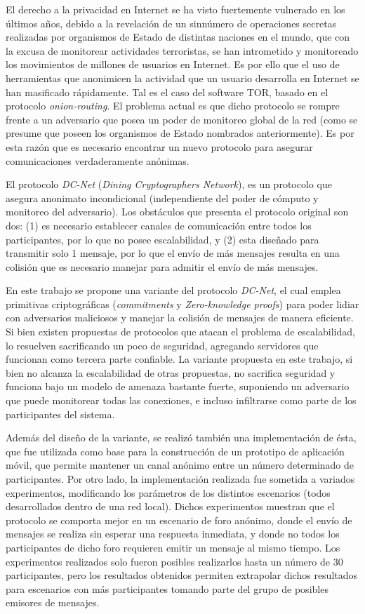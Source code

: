 El derecho a la privacidad en Internet se ha visto fuertemente 
vulnerado en los últimos años, debido a la revelación de un 
sinnúmero de operaciones secretas realizadas por organismos de 
Estado de distintas naciones en el mundo, que con la excusa de 
monitorear actividades terroristas, se han intrometido y monitoreado 
los movimientos de millones de usuarios en Internet. Es por 
ello que el uso de herramientas que anonimicen la actividad 
que un usuario desarrolla en Internet se han masificado 
rápidamente. Tal es el caso del software TOR, basado en el 
protocolo \emph{onion-routing}. El problema actual es que 
dicho protocolo se rompre frente a un adversario que posea 
un poder de monitoreo global de la red (como se presume que 
poseen los organismos de Estado nombrados anteriormente). Es 
por esta razón que es necesario encontrar un nuevo protocolo 
para asegurar comunicaciones verdaderamente anónimas.

El protocolo \emph{DC-Net} (\emph{Dining Cryptographers Network}), 
es un protocolo que asegura anonimato incondicional (independiente 
del poder de cómputo y monitoreo del adversario). Los obstáculos 
que presenta el protocolo original son dos: (1) es necesario establecer 
canales de comunicación entre todos los participantes, por lo 
que no posee escalabilidad, y (2) esta diseñado para transmitir 
solo 1 mensaje, por lo que el envío de más mensajes resulta 
en una colisión que es necesario manejar para admitir el 
envío de más mensajes.

En este trabajo se propone una variante del protocolo \emph{DC-Net}, 
el cual emplea primitivas criptográficas (\emph{commitments} y 
\emph{Zero-knowledge proofs}) para poder lidiar con adversarios 
maliciosos y manejar la colisión de mensajes de manera eficiente. 
Si bien existen propuestas de protocolos que atacan el problema 
de escalabilidad, lo resuelven sacrificando un poco de seguridad, 
agregando servidores que funcionan como tercera parte confiable. 
La variante propuesta en este trabajo, si bien no alcanza la 
escalabilidad de otras propuestas, no sacrifica seguridad y 
funciona bajo un modelo de amenaza bastante fuerte, suponiendo 
un adversario que puede monitorear todas las conexiones, e incluso 
infiltrarse como parte de los participantes del sistema.

Además del diseño de la variante, se realizó también una implementación 
de ésta, que fue utilizada como base para la construcción de un 
prototipo de aplicación móvil, que permite mantener un 
canal anónimo entre un número determinado de participantes. 
Por otro lado, la implementación realizada fue sometida a 
variados experimentos, modificando los parámetros de los 
distintos escenarios (todos desarrollados dentro de una red local). 
Dichos experimentos muestran que el protocolo se comporta mejor 
en un escenario de foro anónimo, donde el envío de mensajes 
se realiza sin esperar una respuesta inmediata, y donde no 
todos los participantes de dicho foro requieren emitir un 
mensaje al mismo tiempo. Los experimentos realizados solo 
fueron posibles realizarlos hasta un número de 30 participantes, 
pero los resultados obtenidos permiten extrapolar dichos resultados 
para escenarios con más participantes tomando parte del grupo 
de posibles emisores de mensajes.

